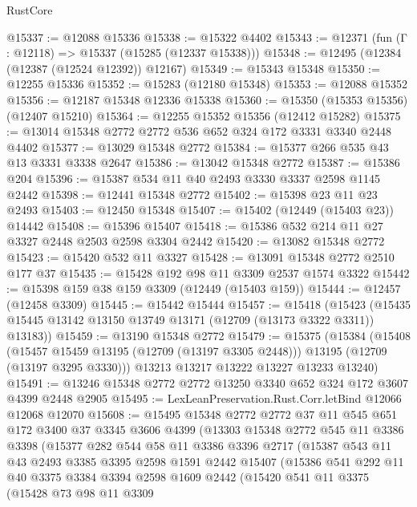 \begin{lexlean}{RustCore}
\begin{coremodule}
@15337 := @12088 @15336
@15338 := @15322 @4402
@15343 := @12371 (fun (Γ : @12118) => @15337 (@15285 (@12337 @15338)))
@15348 := @12495 (@12384 (@12387 (@12524 @12392)) @12167)
@15349 := @15343 @15348
@15350 := @12255 @15336
@15352 := @15283 (@12180 @15348)
@15353 := @12088 @15352
@15356 := @12187 @15348 @12336 @15338
@15360 := @15350 (@15353 @15356) (@12407 @15210)
@15364 := @12255 @15352 @15356 (@12412 @15282)
@15375 := @13014 @15348 @2772 @2772 @536 @652 @324 @172 @3331 @3340 @2448 @4402
@15377 := @13029 @15348 @2772
@15384 := @15377 @266 @535 @43 @13 @3331 @3338 @2647
@15386 := @13042 @15348 @2772
@15387 := @15386 @204
@15396 := @15387 @534 @11 @40 @2493 @3330 @3337 @2598 @1145 @2442
@15398 := @12441 @15348 @2772
@15402 := @15398 @23 @11 @23 @2493
@15403 := @12450 @15348
@15407 := @15402 (@12449 (@15403 @23)) @14442
@15408 := @15396 @15407
@15418 := @15386 @532 @214 @11 @27 @3327 @2448 @2503 @2598 @3304 @2442
@15420 := @13082 @15348 @2772
@15423 := @15420 @532 @11 @3327
@15428 := @13091 @15348 @2772 @2510 @177 @37
@15435 := @15428 @192 @98 @11 @3309 @2537 @1574 @3322
@15442 := @15398 @159 @38 @159 @3309 (@12449 (@15403 @159))
@15444 := @12457 (@12458 @3309)
@15445 := @15442 @15444
@15457 := @15418
    (@15423 (@15435 @15445 @13142 @13150 @13749 @13171 (@12709 (@13173 @3322 @3311)) @13183))
@15459 := @13190 @15348 @2772
@15479 := @15375
    (@15384
      (@15408
        (@15457 @15459 @13195 (@12709 (@13197 @3305 @2448)))
        @13195
        (@12709 (@13197 @3295 @3330)))
      @13213
      @13217
      @13222
      @13227
      @13233
      @13240)
@15491 := @13246 @15348 @2772 @2772 @13250 @3340 @652 @324 @172 @3607 @4399 @2448 @2905
@15495 := LexLeanPreservation.Rust.Corr.letBind @12066 @12068 @12070
@15608 := @15495
    @15348
    @2772
    @2772
    @37
    @11
    @545
    @651
    @172
    @3400
    @37
    @3345
    @3606
    @4399
    (@13303
      @15348
      @2772
      @545
      @11
      @3386
      @3398
      (@15377
        @282
        @544
        @58
        @11
        @3386
        @3396
        @2717
        (@15387
          @543
          @11
          @43
          @2493
          @3385
          @3395
          @2598
          @1591
          @2442
          @15407
          (@15386
            @541
            @292
            @11
            @40
            @3375
            @3384
            @3394
            @2598
            @1609
            @2442
            (@15420
              @541
              @11
              @3375
              (@15428
                @73
                @98
                @11
                @3309

\end{coremodule}
\end{lexlean}
